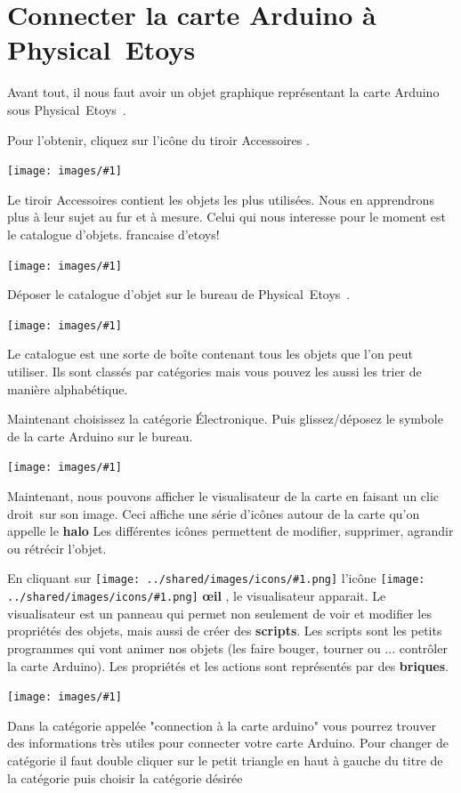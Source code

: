 \documentclass[a4paper,12pt]{article}
\def\appName{Physical~Etoys~}
\def\rc{clic droit~}
\newcommand{\screenshot}[1]
{
\begin{center}
	\texttt{[image: images/\#1]}
\end{center}
}
\newcommand{\important}[1]{\textbf{#1}}
\newcommand{\keyword}[2]{\important{\gls{#1}}}
\newcommand{\inserticon}[1]
{
\texttt{[image: ../shared/images/icons/\#1.png]}
}
\newcommand{\icon}[2][]
{
\ifthenelse {\equal{#1} {}} {\inserticon{#2}} {l'icône \inserticon{#2} \important{#1}}
}
\begin{document}
\section{Connecter la carte Arduino à \appName}

Avant tout, il nous faut avoir un objet graphique représentant la carte Arduino
sous \appName.

Pour l'obtenir, cliquez sur l'icône du tiroir \og Accessoires \fg.

\screenshot{01.png}

Le tiroir \og Accessoires \fg contient les objets les plus utilisées. Nous en
apprendrons plus à leur sujet au fur et à mesure. Celui qui nous interesse pour
le moment est le catalogue d'objets. %
francaise d'etoys!

\screenshot{02.png}

Déposer le catalogue d'objet sur le bureau de \appName.

\screenshot{03.png}

Le catalogue est une sorte de boîte contenant tous les objets que l'on peut
utiliser. Ils sont classés par catégories mais vous pouvez les aussi les trier
de manière alphabétique.

Maintenant choisissez la catégorie \og Électronique\fg. Puis glissez/déposez le
symbole de la carte Arduino sur le bureau.

\screenshot{04.png}
  
Maintenant, nous pouvons afficher le visualisateur de la carte en faisant un
\rc sur son image. Ceci affiche une série d'icônes autour de la carte qu'on
appelle le \keyword{halo}. Les différentes icônes permettent de modifier,
supprimer, agrandir ou rétrécir l'objet.

En cliquant sur \icon[\oe il]{eye}, le visualisateur apparait. Le visualisateur
est un panneau qui permet non seulement de voir et modifier les propriétés des
objets, mais aussi de créer des \important{scripts}. Les scripts sont les
petits programmes qui vont animer nos objets (les faire bouger, tourner ou ...
contrôler la carte Arduino).  Les propriétés et les actions sont représentés
par des \important{briques}.

\screenshot{05.png}

Dans la catégorie appelée "connection à la carte arduino" vous pourrez trouver
des informations très utiles pour connecter votre carte Arduino. Pour changer
de catégorie il faut double cliquer sur le petit triangle en haut à gauche du
titre de la catégorie puis choisir la catégorie désirée
\end{document}

